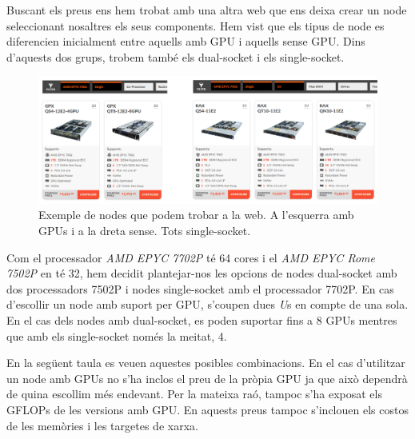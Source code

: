 Buscant els preus ens hem trobat amb una altra web \cite{webnodes} que ens deixa crear un node seleccionant nosaltres els seus components. Hem vist que els tipus de node es diferencien inicialment entre aquells amb GPU i aquells sense GPU. Dins d'aquests dos grups, trobem també els dual-socket i els single-socket.\\

\begin{figure}[h]
    \centering
    \includegraphics[width=\textwidth]{img/webnodes.png}
    \caption{Exemple de nodes que podem trobar a la web. A l'esquerra amb GPUs i a la dreta sense. Tots single-socket.}
\end{figure}

Com el processador \textit{AMD EPYC 7702P} té 64 cores i el \textit{AMD EPYC Rome 7502P} en té 32, hem decidit plantejar-nos les opcions de nodes dual-socket amb dos processadors 7502P i nodes single-socket amb el processador 7702P. En cas d'escollir un node amb suport per GPU, s'coupen dues \textit{U}s en compte de una sola. En el cas dels nodes amb dual-socket, es poden suportar fins a 8 GPUs mentres que amb els single-socket només la meitat, 4.

 En la següent taula es veuen aquestes posibles combinacions. En el cas d'utilitzar un node amb GPUs no s'ha inclos el preu de la pròpia GPU ja que això dependrà de quina escollim més endevant. Per la mateixa raó, tampoc s'ha exposat els GFLOPs de les versions amb GPU. En aquests preus tampoc s'inclouen els costos de les memòries i les targetes de xarxa.

